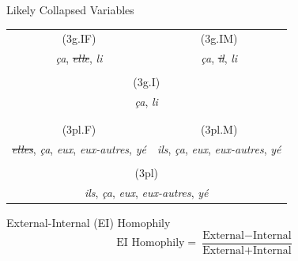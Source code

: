 \documentclass{beamer}\usepackage[]{graphicx}\usepackage[]{xcolor}
\newcommand{\lexi}[1]{\textit{#1}}
\begin{document}
    \begin{frame}{Likely Collapsed Variables}
      \centering
      \begin{tabular}{c c}
        (3g.IF)                                                                  & (3g.IM) \\
        \lexi{ça}, \sout{\lexi{elle}}, \lexi{li}                                 & \lexi{ça}, \sout{\lexi{il}}, \lexi{li} \\
                                                                                 & \\
        \multicolumn{2}{c}{(3g.I)} \\
        \multicolumn{2}{c}{\lexi{ça}, \lexi{li}} \\
                                                                                 & \\
        \hline
                                                                                 & \\
        (3pl.F)                                                                  & (3pl.M) \\
        \sout{\lexi{elles}}, \lexi{ça}, \lexi{eux}, \lexi{eux-autres}, \lexi{yé} & \lexi{ils}, \lexi{ça}, \lexi{eux}, \lexi{eux-autres}, \lexi{yé} \\
                                                                                 & \\
        \multicolumn{2}{c}{(3pl)} \\
        \multicolumn{2}{c}{\lexi{ils}, \lexi{ça}, \lexi{eux}, \lexi{eux-autres}, \lexi{yé}} \\
      \end{tabular}
    \end{frame}

    \begin{frame}{External-Internal (EI) Homophily}
      \begin{equation*}
        \label{eq:ei_homoph}
        \text{EI Homophily} = \frac{\text{External} - \text{Internal}}{\text{External} + \text{Internal}}
      \end{equation*}
    \end{frame}
\end{document}
